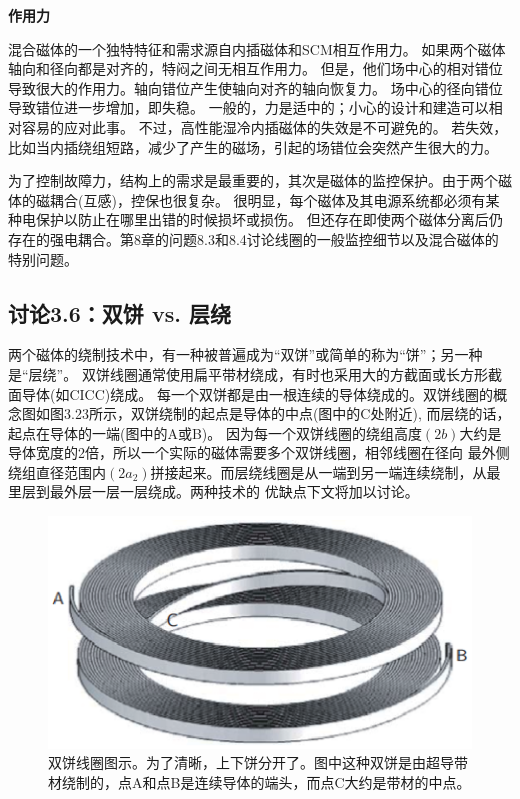 \textbf{作用力}

混合磁体的一个独特特征和需求源自内插磁体和SCM相互作用力。
如果两个磁体轴向和径向都是对齐的，特闷之间无相互作用力。
但是，他们场中心的相对错位导致很大的作用力。轴向错位产生使轴向对齐的轴向恢复力。
场中心的径向错位导致错位进一步增加，即失稳。
一般的，力是适中的；小心的设计和建造可以相对容易的应对此事。
不过，高性能湿冷内插磁体的失效是不可避免的。
若失效，比如当内插绕组短路，减少了产生的磁场，引起的场错位会突然产生很大的力。

为了控制故障力，结构上的需求是最重要的，其次是磁体的监控保护。由于两个磁体的磁耦合(互感)，控保也很复杂。
很明显，每个磁体及其电源系统都必须有某种电保护以防止在哪里出错的时候损坏或损伤。
但还存在即使两个磁体分离后仍存在的强电耦合。第8章的问题8.3和8.4讨论线圈的一般监控细节以及混合磁体的特别问题。


\subsection{讨论3.6：双饼 vs. 层绕}
两个磁体的绕制技术中，有一种被普遍成为“双饼”或简单的称为“饼”；另一种是“层绕”。
双饼线圈通常使用扁平带材绕成，有时也采用大的方截面或长方形截面导体(如CICC)绕成。
每一个双饼都是由一根连续的导体绕成的。双饼线圈的概念图如图3.23所示，双饼绕制的起点是导体的中点(图中的C处附近),
而层绕的话，起点在导体的一端(图中的A或B)。
因为每一个双饼线圈的绕组高度$(2b)$大约是导体宽度的2倍，所以一个实际的磁体需要多个双饼线圈，相邻线圈在径向
最外侧绕组直径范围内$(2a_2)$拼接起来。而层绕线圈是从一端到另一端连续绕制，从最里层到最外层一层一层绕成。两种技术的
优缺点下文将加以讨论。

\begin{figure}[htbp]
	\centering
	\includegraphics[scale=0.6]{chpt3/figs/fig3.23.eps}
	\caption{双饼线圈图示。为了清晰，上下饼分开了。图中这种双饼是由超导带材绕制的，点A和点B是连续导体的端头，而点C大约是带材的中点。}
\end{figure}

